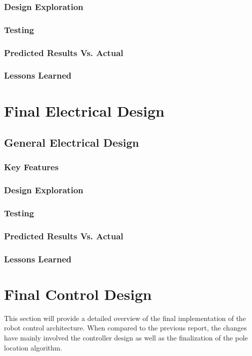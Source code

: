 \documentclass[ece]{uw-wkrpt}
\let\oldsection\section
\renewcommand\section{\clearpage\oldsection}
\begin{document}
\subsubsection{Design Exploration}
\subsubsection{Testing}
\subsubsection{Predicted Results Vs. Actual}
\subsubsection{Lessons Learned}
% 
\section{Final Electrical Design}
\subsection{General Electrical Design}
\subsubsection{Key Features}
\subsubsection{Design Exploration} 
\subsubsection{Testing} 
\subsubsection{Predicted Results Vs. Actual} 
\subsubsection{Lessons Learned}
% 
\section{Final Control Design}
This section will provide a detailed overview of the final implementation of the robot control architecture. When compared to the previous report, the changes have mainly involved the controller design as well as the finalization of the pole location algorithm.
% 
\end{document}
